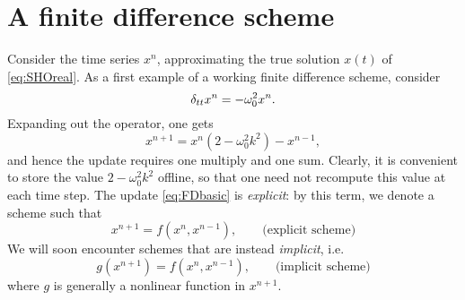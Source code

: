 


\section{A finite difference scheme}

Consider the time series $x^n$, approximating the true solution $x(t)$ of \eqref{eq:SHOreal}. As a first example of a working finite difference scheme, consider
\begin{equation}\label{eq:Scheme1}
    \delta_{tt} x^n = -\omega_0^2 x^n.
\end{equation}
Expanding out the operator, one gets 
\begin{equation}\label{eq:FDbasic}
    x^{n+1} = x^n(2-\omega_0^2 k^2) - x^{n-1},
\end{equation}
and hence the update requires one multiply and one sum. Clearly, it is convenient to store the value $2-\omega_0^2 k^2$ offline, so that one need not  recompute this value at each time step. The update \eqref{eq:FDbasic} is \emph{explicit}: by this term, we denote a scheme such that
\begin{equation}
    x^{n+1} = f(x^n,x^{n-1}), \qquad \text{(explicit scheme)}
\end{equation}
We will soon encounter schemes that are instead \emph{implicit}, i.e. 
\begin{equation}\label{eq:ImplSchemeDef}
    g(x^{n+1})= f(x^n,x^{n-1}), \qquad \text{(implicit scheme)}
\end{equation}
where $g$ is generally a nonlinear function in  $x^{n+1}$.


